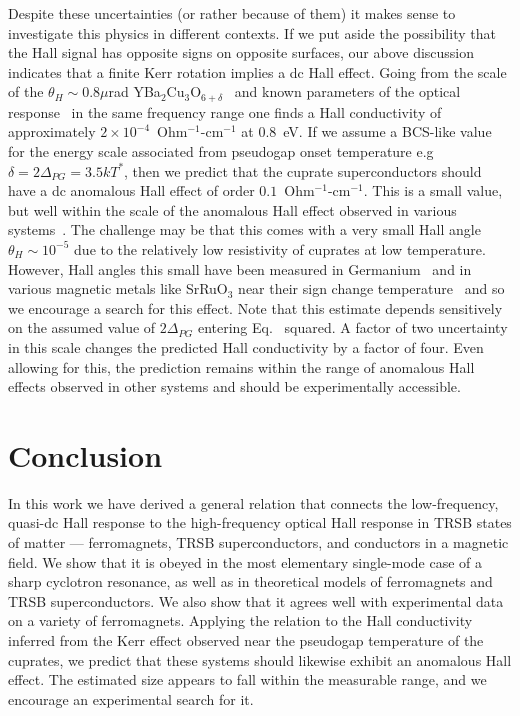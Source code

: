\documentclass[aps,prb,twocolumn,superscriptaddress]{revtex4-2}
\begin{document}
Despite these uncertainties (or rather because of them) it makes sense to investigate this physics in different contexts. If we put aside the possibility that the Hall signal has opposite signs on opposite surfaces, our above discussion indicates that a finite Kerr rotation implies a dc Hall effect. Going from the scale of the $\theta_H\sim0.8\mu$rad YBa$_2$Cu$_3$O$_{6+\delta}$~ and known parameters of the optical response~ in the same frequency range one finds a Hall conductivity of approximately $2\times10^{-4}$~Ohm$^{-1}$-cm$^{-1}$ at 0.8~eV. If we assume a BCS-like value for the energy scale associated from pseudogap onset temperature e.g $\delta=2\Delta_{PG}=3.5kT^*$, then we predict that the cuprate superconductors should have a dc anomalous Hall effect of order $0.1$~Ohm$^{-1}$-cm$^{-1}$. This is a small value, but well within the scale of the anomalous Hall effect observed in various systems~. The challenge may be that this comes with a very small Hall angle $\theta_H\sim10^{-5}$ due to the relatively low resistivity of cuprates at low temperature. However, Hall angles this small have been measured in Germanium~ and in various magnetic metals like SrRuO$_3$ near their sign change temperature~ and so we encourage a search for this effect. Note that this estimate depends sensitively on the assumed value of $2\Delta_{PG}$ entering Eq.~ squared. A factor of two uncertainty in this scale changes the predicted Hall conductivity by a factor of four. Even allowing for this, the prediction remains within the range of anomalous Hall effects observed in other systems and should be experimentally accessible.

\section{Conclusion}

In this work we have derived a general relation that connects the low-frequency, quasi-dc Hall response to the high-frequency optical Hall response in TRSB states of matter --- ferromagnets, TRSB superconductors, and conductors in a magnetic field. We show that it is obeyed in the most elementary single-mode case of a sharp cyclotron resonance, as well as in theoretical models of ferromagnets and TRSB superconductors. We also show that it agrees well with experimental data on a variety of ferromagnets. Applying the relation to the Hall conductivity inferred from the Kerr effect observed near the pseudogap temperature of the cuprates, we predict that these systems should likewise exhibit an anomalous Hall effect. The estimated size appears to fall within the measurable range, and we encourage an experimental search for it.
\end{document}
